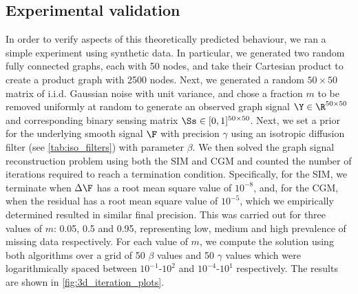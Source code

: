 \subsection{Experimental validation}

In order to verify aspects of this theoretically predicted behaviour, we ran a simple experiment using synthetic data. In particular, we generated two random fully connected graphs, each with 50 nodes, and take their Cartesian product to create a product graph with 2500 nodes. Next, we generated a random $50 \times 50$ matrix of i.i.d. Gaussian noise with unit variance, and chose a fraction $m$ to be removed uniformly at random to generate an observed graph signal $\Y \in \R^{50 \times 50}$ and corresponding binary sensing matrix $\Ss \in [0, 1]^{50 \times 50}$. Next, we set a prior for the underlying smooth signal $\F$ with precision $\gamma$ using an isotropic diffusion filter (see \cref{tab:iso_filters}) with parameter $\beta$. We then solved the graph signal reconstruction problem using both the SIM and CGM and counted the number of iterations required to reach a termination condition. Specifically, for the SIM, we terminate when $\Delta\F$ has a root mean square value of $10^{-8}$, and, for the CGM, when the residual has a root mean square value of $10^{-5}$, which we empirically determined resulted in similar final precision. This was carried out for three values of $m$: 0.05, 0.5 and 0.95, representing low, medium and high prevalence of missing data respectively. For each value of $m$, we compute the solution using both algorithms over a grid of 50 $\beta$ values and 50 $\gamma$ values which were logarithmically spaced between $10^{-1}$-$10^2$ and $10^{-4}$-$10^1$ respectively. The results are shown in \cref{fig:3d_iteration_plots}. 


